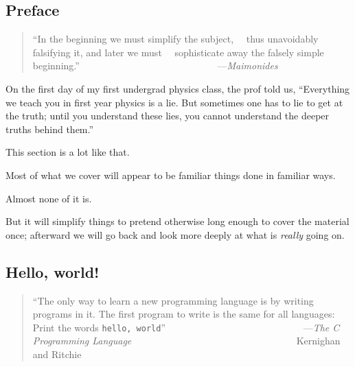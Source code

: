 
\subsection{Preface}
\label{section:tut:familiar:preface}

\begin{quote}\begin{tiny}
        ``In the beginning we must simplify the subject,\newline
          ~~thus unavoidably falsifying it, and later we must\newline
         ~~sophisticate away the falsely simple beginning.''\newline
\newline
         ~~~~~~~~~~~~~~~~~~~~~~~~~~~~---{\em Maimonides}
\end{tiny}\end{quote}


On the first day of my first undergrad physics class, the 
prof told us, ``Everything we teach you in first year physics 
is a lie.  But sometimes one has to lie to get at the truth; 
until you understand these lies, you cannot understand the 
deeper truths behind them.''

This section is a lot like that.

Most of what we cover will appear to be familiar things done in familiar ways.

Almost none of it is.

But it will simplify things to pretend otherwise 
long enough to cover the material once;  afterward we will 
go back and look more deeply at what is {\em really} going on.


\cutend*

\subsection{Hello, world!}

\begin{quote}\begin{tiny}
        ``The only way to learn a new programming language is by writing\newline
          programs in it.  The first program to write is the same for\newline
          all languages:  Print the words {\tt hello, world}''\newline
\newline
         ~~~~~~~~~~~~~~~~~~~~~~~~~~~~---{\em The C Programming Language}\newline
         ~~~~~~~~~~~~~~~~~~~~~~~~~~~~~~~~~ Kernighan and Ritchie
\end{tiny}\end{quote}

